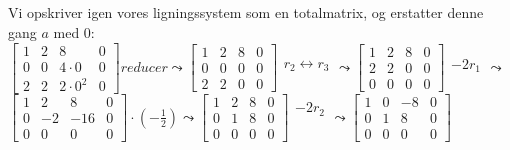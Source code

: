 \documentclass[a4paper,12pt]{article}
\begin{document}
\subsection{}
Vi opskriver igen vores ligningssystem som en totalmatrix, og erstatter denne gang $a$ med 0:\\
$
\left[\begin{array}{ccc|c}
    1 & 2 & 8 & 0 \\
    0 & 0 & 4\cdot0 & 0 \\
    2 & 2 & 2\cdot0^2 & 0
\end{array}\right]
reducer
\leadsto
\left[\begin{array}{ccc|c}
    1 & 2 & 8 & 0 \\
    0 & 0 & 0 & 0 \\
    2 & 2 & 0 & 0
\end{array}\right]
\begin{array}{cccc}
    \\
    r_2 \leftrightarrow r_3\\
    \\
\end{array}
\leadsto
\left[\begin{array}{ccc|c}
    1 & 2 & 8 & 0 \\
    2 & 2 & 0 & 0 \\
    0 & 0 & 0 & 0
\end{array}\right]
\begin{array}{ccc}
    \\
    -2r_1\\
    \\
\end{array}
\leadsto
$\\
$
\left[\begin{array}{ccc|c}
    1 & 2 & 8 & 0 \\
    0 & -2 & -16 & 0 \\
    0 & 0 & 0 & 0
\end{array}\right]
\cdot (-\frac{1}{2})
\leadsto
\left[\begin{array}{ccc|c}
    1 & 2 & 8 & 0 \\
    0 & 1 & 8 & 0 \\
    0 & 0 & 0 & 0
\end{array}\right]
\begin{array}{ccc}
    -2r_2\\
    \\
    \\
\end{array}
\leadsto
\left[\begin{array}{ccc|c}
    1 & 0 & -8 & 0 \\
    0 & 1 & 8 & 0 \\
    0 & 0 & 0 & 0
\end{array}\right]
$\\
\end{document}
